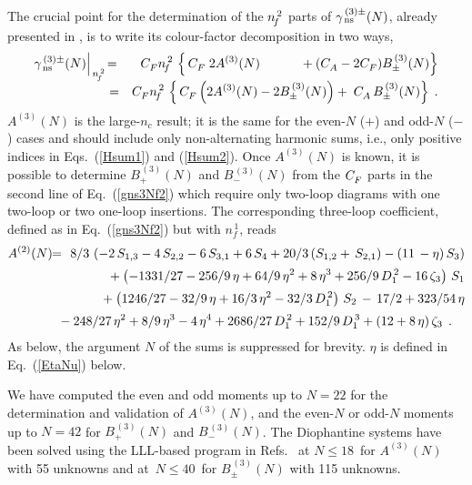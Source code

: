 \documentclass[12pt]{article}
\newcommand{\hspn}{{\hspace{-4mm}}}
\newcommand{\bea}{\begin{eqnarray}}
\newcommand{\eea}{\end{eqnarray}}
\newcommand{\nn}{\nonumber}
\begin{document}
The crucial point for the determination of the ${n^{\,2}_{\! f}}$ parts of 
$\gamma^{\,(3)\pm}_{\,\rm ns}(N)$, already presented in \cite{avLL2016}, 
is to write its colour-factor decomposition in two ways,
%
\bea
\label{gns3Nf2}
  \gamma^{\,(3)\pm}_{\,\rm ns}(N) \Big|_{\,\nfs} &\!=\!&
  \cf \nfs\, \left\{ \,\cf \; 2A^{(3)}(N) \hspace*{11mm}
  + (\ca-2\cf) B_\pm^{\,(3)}(N) \right\}
\nn \\[-1.5mm] &=&
  \cf \nfs\, \left\{ \,\cf \left( 2A^{(3)}(N)-2B^{\,(3)}_\pm(N) \right) 
 + \; \ca\, B_\pm^{\,(3)}(N) \right\}
\; .
\eea
%
$A^{(3)}(N)$ is the large-$n_c$ result; it is the same for the even-$N$ ($+$) 
and odd-$N$ ($-$) cases and should include only non-alternating harmonic sums,
i.e., only positive indices in Eqs.~(\ref{Hsum1}) and (\ref{Hsum2}).
Once $A^{(3)}(N)$ is known, it is possible to determine $B_+^{\,(3)}(N)$ and 
$B_-^{\,(3)}(N)$ from the ${C^{}_F}$ parts in the second line of Eq.~(\ref{gns3Nf2})
which require only two-loop diagrams with one two-loop or two one-loop 
insertions. The corresponding three-loop coefficient, defined as in 
Eq.~(\ref{gns3Nf2}) but with $n_{\!f}^{\,1}$, reads
%
\bea
\label{A2}
 A^{(2)}(N) &\!\!=\!\!&
      8/3 \* \, \left(
      - 2 \*\, \Ss(1,3) - 4\*\, \Ss(2,2) - 6\*\, \Ss(3,1) + 6\*\, \S(4)
      + 20/3 \*\, (\Ss(1,2) + \, \Ss(2,1)) - ( 11\, - \eta ) \*\, \S(3)
      \right)
\nn \\[0.5mm] & & \mbox{\hspn}
      + \left( -1331/27 - 256/9 \*\, \eta + 64/9 \*\, \eta^2
         + 8 \*\, \eta^3 + 256/9 \*\, D_1^{\,2} - 16 \*\,\z3 \right) \*\, \S(1)
\nn \\[0.5mm] & & \mbox{\hspn}
      + \left( 1246/27 - 32/9 \*\, \eta + 16/3 \*\, \eta^2- 32/3 \*\,
        D_1^{\,2} \right) \*\, \S(2)
      \, - \,  17/2 + 323/54 \*\, \eta 
\nn \\[0.5mm] & & \mbox{\hspn}
        - 248/27 \*\, \eta^2 + 8/9 \*\, \eta^3
      - 4 \*\, \eta^4 
      + 2686/27 \*\, D_1^{\,2} + 152/9 \,\* D_1^{\,3}
      + (12+8 \*\, \eta) \*\, \z3 
\:\: . \quad
\eea
%
As below, the argument $N$ of the sums is suppressed for brevity.  
$\eta$ is defined in Eq.~(\ref{EtaNu}) below.

We have computed the even and odd moments up to $N = 22$ for the determination
and validation of $A^{(3)}(N)$, and the even-$N$ or odd-$N$ moments up to 
$N = 42$ for $B_+^{\,(3)}(N)$ and $B_-^{\,(3)}(N)$. 
The Diophantine systems have been solved using the LLL-based program in 
Refs.~\cite{axbAlg,Calc} at $N \leq 18\,$ for $A^{(3)}(N)$ with 55 unknowns
and at $\,N \leq 40\,$ for $B_\pm^{\,(3)}(N)$ with 115 unknowns.
\end{document}
